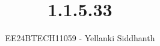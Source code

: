 \documentclass[journal]{IEEEtran}
\begin{document}

\vspace{3cm}

\title{1.1.5.33}
\author{EE24BTECH11059 - Yellanki Siddhanth
}
{\let\newpage\relax\maketitle}

\renewcommand{\thefigure}{\theenumi}
\renewcommand{\thetable}{\theenumi}
\setlength{\intextsep}{10pt} %


\renewcommand{\thetable}{\theenumi}
\end{document}
